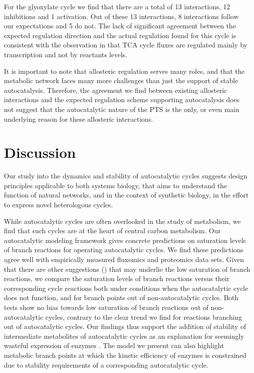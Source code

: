     For the glyoxylate cycle we find that there are a total of 13 interactions, 12 inhibitions and 1 activation.
    Out of these 13 interactions, 8 interactions follow our expectations and 5 do not.
    The lack of significant agreement between the expected regulation direction and the actual regulation found for this cycle is consistent with the observation in \cite{Gerosa2015-oq} that TCA cycle fluxes are regulated mainly by transcription and not by reactants levels.

    It is important to note that allosteric regulation serves many roles, and that the metabolic network faces many more challenges than just the support of stable autocatalysis.
    Therefore, the agreement we find between existing allosteric interactions and the expected regulation scheme supporting autocatalysis does not suggest that the autocatalytic nature of the PTS is the only, or even main underlying reason for these allosteric interactions.
\section{Discussion}
Our study into the dynamics and stability of autocatalytic cycles suggests design principles applicable to both systems biology, that aims to understand the function of natural networks, and in the context of synthetic biology, in the effort to express novel heterologous cycles.

While autocatalytic cycles are often overlooked in the study of metabolism, we find that such cycles are at the heart of central carbon metabolism.
Our autocatalytic modeling framework gives concrete predictions on saturation levels of branch reactions for operating autocatalytic cycles.
We find these predictions agree well with empirically measured fluxomics and proteomics data sets.
Given that there are other suggestions (\cite{Staples1997-fq,Weiss1998-gp,Suarez1997-jo}) that may underlie the low saturation of branch reactions, we compare the saturation levels of branch reactions versus their corresponding cycle reactions both under conditions when the autocatalytic cycle does not function, and for branch points out of non-autocatalytic cycles.
Both tests show no bias towards low saturation of branch reactions out of non-autocatalytic cycles, contrary to the clear trend we find for reactions branching out of autocatalytic cycles.
Our findings thus support the addition of stability of intermediate metabolites of autocatalytic cycles as an explanation for seemingly wasteful expression of enzymes \cite{Salvador2003-fc, Salvador2006-yx}.
The model we present can also highlight metabolic branch points at which the kinetic efficiency of enzymes is constrained due to stability requirements of a corresponding autocatalytic cycle.

